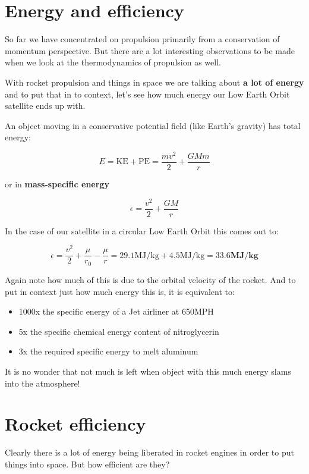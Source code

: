 \documentclass[twocolumn]{memoir} %
\begin{document}
\section{Energy and efficiency}\label{energy-thermodynamics-and-efficiency}

So far we have concentrated on propulsion primarily from a conservation
of momentum perspective. But there are a lot interesting observations to
be made when we look at the thermodynamics of propulsion as well.

With rocket propulsion and things in space we are talking about
\textbf{a lot of energy} and to put that in to context, let's see how
much energy our Low Earth Orbit satellite ends up with.

An object moving in a conservative potential field (like Earth's
gravity) has total energy:

\[E = \text{KE} + \text{PE} = \frac{m v^2}{2} + \frac{GMm}{r}\]

or in \textbf{mass-specific energy}

\[\epsilon = \frac{v^2}{2} + \frac{GM}{r}\]

In the case of our satellite in a circular Low Earth Orbit this comes
out to:

\[\epsilon = \frac{v^2}{2} + \frac{\mu}{r_0} - \frac{\mu}{r} = 29.1 \text{MJ/kg} + 4.5 \text{MJ/kg} = \mathbf{33.6} \textbf{MJ/kg}\]

Again note how much of this is due to the orbital velocity of the
rocket. And to put in context just how much energy this is, it is
equivalent to:

\begin{itemize}
\item
  1000x the specific energy of a Jet airliner at 650MPH
\item
  5x the specific chemical energy content of nitroglycerin
\item
  3x the required specific energy to melt aluminum
\end{itemize}

It is no wonder that not much is left when object with this much energy
slams into the atmosphere!

\section{Rocket efficiency}\label{rocket-efficiency}

Clearly there is a lot of energy being liberated in rocket engines in
order to put things into space. But how efficient are they?
\end{document}
